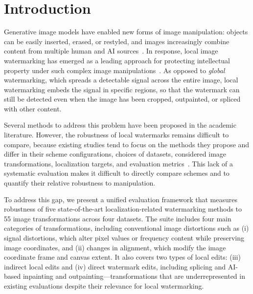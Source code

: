 \documentclass[sigconf,nonacm]{acmart}
\begin{document}


\maketitle



\section{Introduction}
\label{sec:introduction}
Generative image models have enabled new forms of image manipulation: objects can be easily inserted, erased, or restyled, and images increasingly combine content from multiple human and AI sources~\cite{rombach2022highresolution,yu2023inpaint}.
In response, local image watermarking has emerged as a leading approach for protecting intellectual property under such complex image manipulations~\cite{wam,maskwm}.
As opposed to {\it global} watermarking, which spreads a detectable signal across the entire image, local watermarking embeds the signal in specific regions, so that the watermark can still be detected even when the image has been cropped, outpainted, or spliced with other content.

Several methods to address this problem have been proposed in the academic literature.
However, the robustness of local watermarks remains difficult to compare, because existing studies tend to focus on the methods they propose and differ in their scheme configurations, choices of datasets, considered image transformations, localization targets, and evaluation metrics~\cite{wam,maskwm}.
This lack of a systematic evaluation makes it difficult to directly compare schemes and to quantify their relative robustness to manipulation.

To address this gap, we present a unified evaluation framework that measures robustness of five state-of-the-art localization-related watermarking methods to 55 image transformations across four datasets.
The suite includes four main categories of transformations, including conventional image distortions such as (i) signal distortions, which alter pixel values or frequency content while preserving image coordinates, and (ii) changes in alignment, which modify the image coordinate frame and canvas extent.
It also covers two types of local edits: (iii) indirect local edits and (iv) direct watermark edits, including splicing and AI-based inpainting and outpainting---transformations that are underrepresented in existing evaluations despite their relevance for local watermarking.
\end{document}
